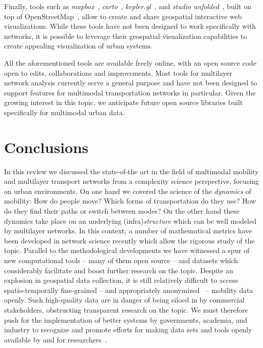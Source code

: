 Finally, tools such as \textit{mapbox}~\cite{mapbox}, \textit{carto}~\cite{carto}, \textit{kepler.gl}~\cite{kepler2021kepler}, and \textit{studio unfolded}~\cite{unfolded}, built on top of OpenStreetMap~\cite{OpenStreetMap}, allow to create and share geospatial interactive web visualizations. While these tools have not been designed to work specifically with networks, it is possible to leverage their geospatial visualization capabilities to create appealing visualization of urban systems.

All the aforementioned tools are available freely online, with an open source code open to edits, collaborations and improvements. Most tools for multilayer network analysis currently serve a general purpose and have not been designed to support features for multimodal transportation networks in particular. Given the growing interest in this topic, we anticipate future open source libraries built specifically for multimodal urban data.

\section{Conclusions \label{sec:conclusions}}

In this review we discussed the state-of-the art in the field of multimodal mobility and multilayer transport networks from a complexity science perspective, focusing on urban environments. On one hand we covered the science of the \emph{dynamics} of mobility: How do people move? Which forms of transportation do they use? How do they find their paths or switch between modes? On the other hand these dynamics take place on an underlying (infra)\emph{structure} which can be well modeled by multilayer networks. In this context, a number of mathematical metrics have been developed in network science recently which allow the rigorous study of the topic. Parallel to the methodological developments we have witnessed a spur of new computational tools -- many of them open source -- and datasets which considerably facilitate and boost further research on the topic. Despite an explosion in geospatial data collection, it is still relatively difficult to access spatio-temporally fine-grained -- and appropriately anonymized~\cite{de2013unique} -- mobility data openly. Such high-quality data are in danger of being siloed in by commercial stakeholders, obstructing transparent research on the topic. We must therefore push for the implementation of better systems by governments, academia, and industry to recognize and promote efforts for making data sets and tools openly available by and for researchers~\cite{stodden2016enhancing,lovelace2021open}. 

